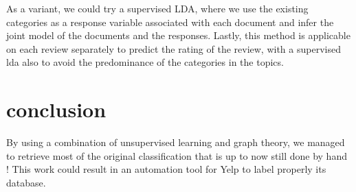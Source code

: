 \documentclass[twoside]{article}
\begin{document}
\begin{multicols}{2}
As a variant, we could try a supervised LDA, where we use the existing categories as a response variable associated with each document and infer the joint model of the documents and the responses. Lastly, this method is applicable on each review separately to predict the rating of the review, with a supervised lda also to avoid the predominance of the categories in the topics.


\section{conclusion}
By using a combination of unsupervised learning and graph theory, we managed to retrieve most of the original classification that is up to now still done by hand ! This work could result in an automation tool for Yelp to label properly its database. 


\nocite{*} %


\end{multicols}
\end{document}
